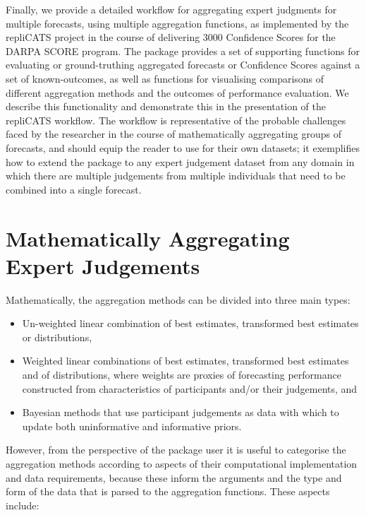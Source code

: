 \documentclass[article]{jss}
\begin{document}
Finally, we provide a detailed workflow for aggregating expert judgments
for multiple forecasts, using multiple aggregation functions, as
implemented by the repliCATS project in the course of delivering 3000
Confidence Scores for the DARPA SCORE program. The 
package provides a set of supporting functions for evaluating or
ground-truthing aggregated forecasts or Confidence Scores against a set
of known-outcomes, as well as functions for visualising comparisons of
different aggregation methods and the outcomes of performance
evaluation. We describe this functionality and demonstrate this in the
presentation of the repliCATS workflow. The workflow is representative
of the probable challenges faced by the researcher in the course of
mathematically aggregating groups of forecasts, and should equip the
reader to use  for their own datasets; it exemplifies how
to extend the  package to any expert judgement dataset
from any domain in which there are multiple judgements from multiple
individuals that need to be combined into a single forecast.

\hypertarget{mathematically-aggregating-expert-judgements}{%
\section{Mathematically Aggregating Expert
Judgements}\label{mathematically-aggregating-expert-judgements}}

Mathematically, the aggregation methods can be divided into three main
types:

\begin{itemize}
\item
  Un-weighted linear combination of best estimates, transformed best
  estimates or distributions,
\item
  Weighted linear combinations of best estimates, transformed best
  estimates and of distributions, where weights are proxies of
  forecasting performance constructed from characteristics of
  participants and/or their judgements, and
\item
  Bayesian methods that use participant judgements as data with which to
  update both uninformative and informative priors.
\end{itemize}

However, from the perspective of the  package user it is
useful to categorise the aggregation methods according to aspects of
their computational implementation and data requirements, because these
inform the arguments and the type and form of the data that is parsed to
the aggregation functions. These aspects include:
\end{document}
